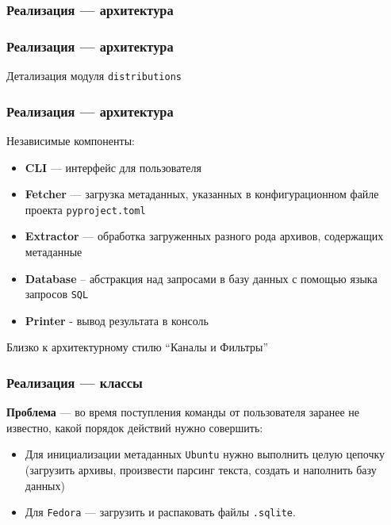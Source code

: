 \documentclass{beamer}
\begin{document}
\begin{frame}[fragile]
	\frametitle{Реализация --- архитектура}
	\begin{figure}[ht]
		\centering
		
	\end{figure}
\end{frame}

\begin{frame}[fragile]
	\frametitle{Реализация --- архитектура}
	Детализация модуля \texttt{distributions}
	\begin{figure}[ht]
		\centering
		
	\end{figure}
\end{frame}

\begin{frame}[t]
	\frametitle{Реализация --- архитектура}
	Независимые компоненты:
	\begin{itemize}
		\item \textbf{CLI} --- интерфейс для пользователя
		\item \textbf{Fetcher} --- загрузка метаданных, указанных в конфигурационном файле проекта \texttt{pyproject.toml}
		\item \textbf{Extractor} --- обработка загруженных разного рода архивов, содержащих метаданные
		\item \textbf{Database} -- абстракция над запросами в базу данных с помощью языка запросов \texttt{SQL}
		\item \textbf{Printer} - вывод результата в консоль
	\end{itemize}

	Близко к архитектурному стилю \enquote{Каналы и Фильтры}
\end{frame}

\begin{frame}[t]
	\frametitle{Реализация --- классы}
	\textbf{Проблема} --- во время поступления команды от пользователя заранее не известно, какой порядок действий нужно совершить:
	\begin{itemize}
		\item Для инициализации метаданных \texttt{Ubuntu} нужно выполнить целую цепочку (загрузить архивы, произвести парсинг текста, создать и наполнить базу данных)
		\item Для \texttt{Fedora} --- загрузить и распаковать файлы \texttt{.sqlite}.
	\end{itemize}
\end{frame}
\end{document}
